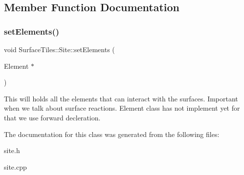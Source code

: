\subsection{Member Function Documentation}
\mbox{\label{classSurfaceTiles_1_1Site_ae5c07154b29b32a5fe89e8be8877420f}} 
\subsubsection{\texorpdfstring{set\+Elements()}{setElements()}}
{\footnotesize\ttfamily void Surface\+Tiles\+::\+Site\+::set\+Elements (\begin{DoxyParamCaption}\item[{Element $\ast$}]{ }\end{DoxyParamCaption})}

This will holds all the elements that can interact with the surfaces. Important when we talk about surface reactions. Element class has not implement yet for that we use forward decleration. 

The documentation for this class was generated from the following files\+:\begin{DoxyCompactItemize}
\item 
site.\+h\item 
site.\+cpp\end{DoxyCompactItemize}
